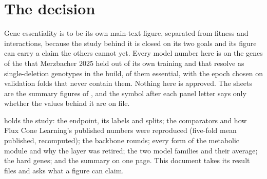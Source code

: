 
\section{The decision}
\label{sec:decision}

Gene essentiality is to be its own main-text figure, separated from fitness and
interactions, because the study behind it is closed on its two goals and its figure can
carry a claim the others cannot yet. Every model number here is on the \gnHeldOut{} genes
of the \gnReleasedHeldOut{} that Merzbacher 2025 held out of its own training and that
resolve as single-deletion genotypes in the build, \gnEssentialHeldOut{} of them
essential, with the epoch chosen on validation folds that never contain them. Nothing here
is approved. The sheets are the summary figures of , and the
symbol after each panel letter says only whether the values behind it are on file.

  holds the study: the
endpoint, its labels and splits; the comparators and how Flux Cone Learning's published
numbers were reproduced (five-fold mean \gfclPublishedCv{} published, \gfclRecomputedCv{}
recomputed); the backbone rounds; every form of the metabolic module and why the layer
was retired; the two model families and their average; the hard genes; and the summary
on one page. This document takes its result files and asks what a figure can claim.

